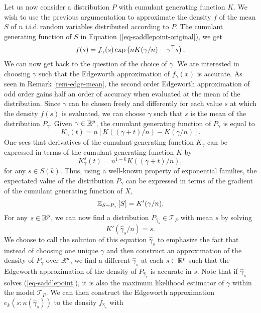 Let us now consider a distribution $P$ with cumulant generating function $K$. We wish to use the previous argumentation to approximate the density $f$ of the mean $S$ of $n$ i.i.d.\,random variables distributed according to $P$. The cumulant generating function of $S$ in Equation (\ref{eq-saddlepoint-original}), we get
\begin{equation*}
    f(s) = f_\gamma(s)\exp\left(nK(\gamma / n) - \gamma^\top s\right).
\end{equation*}
We can now get back to the question of the choice of $\gamma$. We are interested in choosing $\gamma$ such that the Edgeworth approximation of $\bar f_\gamma(x)$ is accurate. As seen in Remark \ref{rem-edge-mean}, the second order Edgeworth approximation of odd order gains half an order of accuracy when evaluated at the mean of the distribution. Since $\gamma$ can be chosen freely and differently for each value $s$ at which the density $f(s)$ is evaluated, we can choose $\gamma$ such that $s$ is the mean of the distribution $P_\gamma$. Given $\gamma \in {\mathbb{R}^p}$, the cumulant generating function of $P_\gamma$ is equal to
\begin{equation*}
    K_\gamma(t) = n\left[K((\gamma + t)/n) - K(\gamma/n)\right].
\end{equation*}
One sees that derivatives of the cumulant generating function $K_\gamma$ can be expressed in terms of the cumulant generating function $K$ by
\begin{equation} \label{eq-deriv-Kgamma}
    K_\gamma^s(t) = n^{1 - k} K((\gamma + t) / n),
\end{equation}
for any $s \in S(k)$. Thus, using a well-known property of exponential families, the expectated value of the distribution $P_\gamma$ can be expressed in terms of the gradient of the cumulant generating function of $X$,
\begin{equation*}
    \mathbb{E}_{S \sim P_\gamma}\left[S\right] = K'(\gamma / n).
\end{equation*}
For any $s \in {\mathbb{R}^p}$, we can now find a distribution $P_{\hat\gamma_s} \in \mathcal{T}_P$ with mean $s$ by solving
\begin{equation} \label{eq-saddlepoint}
    K'(\hat\gamma_s / n) = s.
\end{equation}
We choose to call the solution of this equation $\hat\gamma_s$ to emphasize the fact that instead of choosing one unique $\gamma$ and then construct an approximation of the density of $P_\gamma$ over ${\mathbb{R}^p}$, we find a different $\hat\gamma_s$ at each $s \in {\mathbb{R}^p}$ such that the Edgeworth approximation of the density of $P_{\hat\gamma_s}$ is accurate in $s$. Note that if $\hat\gamma_s$ solves (\ref{eq-saddlepoint}), it is also the maximum likelihood estimator of $\gamma$ within the model $\mathcal{T}_P$. We can then construct the Edgeworth approximation $e_k(s; \kappa(\hat\gamma_s))$ to the density $f_{\hat\gamma_s}$ with
